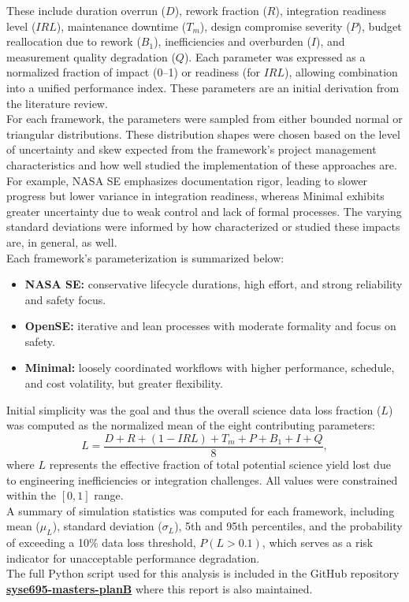 These include duration overrun ($D$), rework fraction ($R$), integration readiness level ($IRL$), maintenance downtime ($T_m$), design compromise severity ($P$), budget reallocation due to rework ($B_1$), inefficiencies and overburden ($I$), and measurement quality degradation ($Q$). 
Each parameter was expressed as a normalized fraction of impact (0–1) or readiness (for $IRL$), allowing combination into a unified performance index.
These parameters are an initial derivation from the literature review.\\
For each framework, the parameters were sampled from either bounded normal or triangular distributions. 
These distribution shapes were chosen based on the level of uncertainty and skew expected from the framework’s project management characteristics and how well studied the implementation of these approaches are. 
For example, NASA SE emphasizes documentation rigor, leading to slower progress but lower variance in integration readiness, whereas Minimal exhibits greater uncertainty due to weak control and lack of formal processes. The varying standard deviations were informed by how characterized or studied these impacts are, in general, as well.\\
Each framework’s parameterization is summarized below:
\begin{itemize}
    \item \textbf{NASA SE:} conservative lifecycle durations, high effort, and strong reliability and safety focus. 
    \item \textbf{OpenSE:} iterative and lean processes with moderate formality and focus on safety.
    \item \textbf{Minimal:} loosely coordinated workflows with higher performance, schedule, and cost volatility, but greater flexibility.
\end{itemize}

Initial simplicity was the goal and thus the overall science data loss fraction ($L$) was computed as the normalized mean of the eight contributing parameters:
\begin{equation}
    L = \frac{D + R + (1 - IRL) + T_m + P + B_1 + I + Q}{8},
\end{equation}
where $L$ represents the effective fraction of total potential science yield lost due to engineering inefficiencies or integration challenges. All values were constrained within the $[0, 1]$ range.\\
A summary of simulation statistics was computed for each framework, including mean ($\mu_L$), standard deviation ($\sigma_L$), 5th and 95th percentiles, and the probability of exceeding a 10\% data loss threshold, $P(L > 0.1)$, which serves as a risk indicator for unacceptable performance degradation.\\

\vspace{1em}
\noindent The full Python script used for this analysis is included in the GitHub repository \hyperref[https://github.com/hannahmclaurin/syse695-masters-planB]{\textbf{syse695-masters-planB}} where this report is also maintained.
